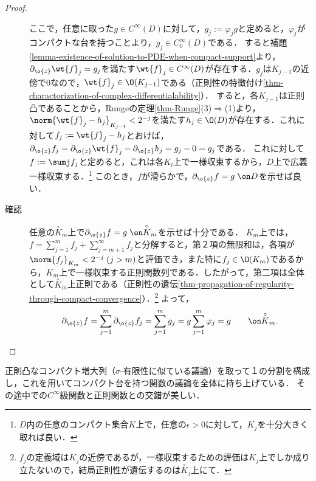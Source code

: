 \documentclass[uplatex, dvipdfmx]{jsreport}
\begin{document}
\begin{proof}
\begin{description}
        ここで，任意に取った$g\in C^\infty(D)$に対して，$g_j:=\varphi_jg$と定めると，$\varphi_j$がコンパクトな台を持つことより，$g_j\in C_0^\infty(D)$である．
        すると補題\ref{lemma-existence-of-solution-to-PDE-when-compact-support}より，$\partial_{\o{z}}\wt{f}_j=g_j$を満たす$\wt{f}_j\in C^\infty(D)$が存在する．$g_j$は$K_{j-1}$の近傍で$0$なので，$\wt{f}_j\in\O(K_{j-1})$である（正則性の特徴付け\ref{thm-charactorization-of-complex-differentialability}）．
        すると，各$K_{j-1}$は正則凸であることから，Rungeの定理\ref{thm-Runge}(3)$\Rightarrow$(1)より，$\norm{\wt{f}_j-h_j}_{K_{j-1}}<2^{-j}$を満たす$h_j\in\O(D)$が存在する．これに対して$f_j:=\wt{f}_j-h_j$とおけば，$\partial_{\o{z}}f_j=\partial_{\o{z}}\wt{f}_j-\partial_{\o{z}}h_j=g_j-0=g_j$である．
        これに対して$f:=\sumj f_j$と定めると，これは各$K_l$上で一様収束するから，$D$上で広義一様収束する．\footnote{$D$内の任意のコンパクト集合$K$上で，任意の$\epsilon>0$に対して，$K_j$を十分大きく取れば良い．}
        このとき，$f$が滑らかで，$\partial_{\o{z}}f=g\;\on D$を示せば良い．
        \item[確認]
        任意の$\overset{\circ}{K}_m$上で$\partial_{\o{z}}f=g\;\on\overset{\circ}{K}_m$を示せば十分である．
        $K_m$上では，$f=\sum^m_{j=1}f_j+\sum_{j=m+1}^\infty f_j$と分解すると，第２項の無限和は，各項が$\norm{f_j}_{K_m}<2^{-j}\;(j>m)$と評価でき，また特に$f_j\in\O(K_m)$であるから，$K_m$上で一様収束する正則関数列である．したがって，第二項は全体として$\overset{\circ}{K}_m$上正則である（正則性の遺伝\ref{thm-propagation-of-regularity-through-compact-convergence}）．\footnote{$f_j$の定義域は$K_j$の近傍であるが，一様収束するための評価は$K_j$上でしか成り立たないので，結局正則性が遺伝するのは$\overset{\circ}{K}_j$上にて．}
        よって，\[\partial_{\o{z}}f=\sum^m_{j=1}\partial_{\o{z}}f_j=\sum^m_{j=1}g_j=g\sum^m_{j=1}\varphi_j=g\qquad\on\overset{\circ}{K}_m.\]
    \end{description}
\end{proof}
\begin{remarks}
    正則凸なコンパクト増大列（$\sigma$-有限性に似ている議論）を取って１の分割を構成し，これを用いてコンパクト台を持つ関数の議論を全体に持ち上げている．
    その途中での$C^\infty$級関数と正則関数との交錯が美しい．
\end{remarks}
\end{document}
